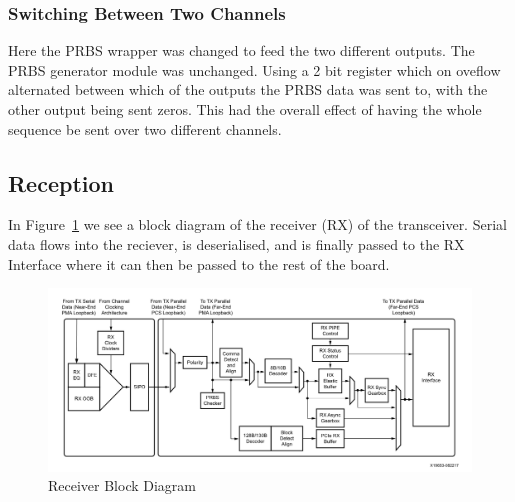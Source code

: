 \subsubsection{Switching Between Two Channels}%
\label{ssub:switching_between_two_channels}
Here the PRBS wrapper was changed to feed the two different outputs. The PRBS
generator module was unchanged. Using a 2 bit register which on oveflow
alternated between which of the outputs the PRBS data was sent to, with the
other output being sent zeros. This had the overall effect of having the whole
sequence be sent over two different channels.



\subsection{Reception}%
\label{sub:reception}
In Figure~\ref{fig:receiver_block} we see a block diagram of the receiver
(RX) of the transceiver. Serial data flows into the reciever, is deserialised,
and is finally passed to the RX Interface where it can then be passed to the
rest of the board.
\begin{figure}[ht]
    \centering
    \hspace*{-1cm}\includegraphics[width=1.2\linewidth]{img/receiver_block.png}
    \caption{Receiver Block Diagram \cite{GTY_guide}}%
    \label{fig:receiver_block}
\end{figure}

